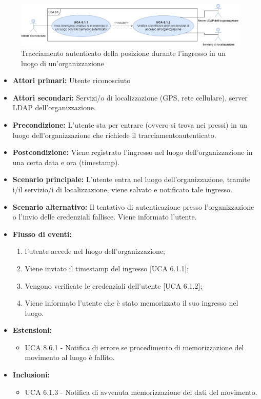 \begin{figure}[h]
	\centering
	\includegraphics[scale=0.4, center]{Sezioni/UseCase/Immagini/UCA6.1.png}
	\caption{Tracciamento autenticato della posizione durante l'ingresso in un luogo di un'organizzazione}
\end{figure}

\begin{itemize}
	\item \textbf{Attori primari:} Utente riconosciuto
	\item \textbf{Attori secondari:} Servizi/o di localizzazione (GPS, rete cellulare), server LDAP dell'organizzazione.
	\item \textbf{Precondizione:} L'utente sta per entrare (ovvero si trova nei pressi) in un luogo dell'organizzazione che richiede il tracciamentoautenticato.
	\item \textbf{Postcondizione:} Viene registrato l'ingresso nel luogo dell'organizzazione in una certa data e ora (timestamp).
	\item \textbf{Scenario principale:} L'utente entra nel luogo dell'organizzazione, tramite i/il servizio/i di localizzazione, viene salvato e notificato tale ingresso.
	\item \textbf{Scenario alternativo:} Il tentativo di autenticazione presso l'organizzazione o l'invio delle credenziali fallisce. Viene informato l'utente.
	\item \textbf{Flusso di eventi:}
	\begin{enumerate}
		\item l'utente accede nel luogo dell'organizzazione;
		\item Viene inviato il timestamp\ap{G}  del ingresso [UCA 6.1.1];
		\item Vengono verificate le credenziali dell'utente [UCA 6.1.2];
		\item Viene informato l'utente che è stato memorizzato il suo ingresso nel luogo.
	\end{enumerate}
	\item \textbf{Estensioni:}
	\begin{itemize}
		\item UCA 8.6.1 - Notifica di errore se procedimento di memorizzazione del movimento al luogo è fallito.
	\end{itemize}
	\item \textbf{Inclusioni:}
	\begin{itemize}
		\item UCA 6.1.3 - Notifica di avvenuta memorizzazione dei dati del movimento.
	\end{itemize}
\end{itemize}

